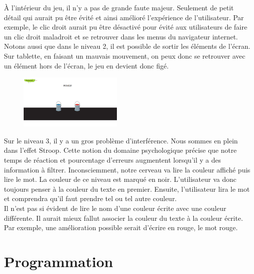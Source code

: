 \documentclass{article}
\begin{document}
\`A l'int\'erieur du jeu, il n'y a pas de grande faute majeur. Seulement de petit d\'etail qui aurait pu \^etre \'evit\'e et ainsi am\'elior\'e l'exp\'erience de l'utilisateur. Par exemple, le clic droit aurait pu \^etre d\'esactiv\'e pour \'evit\'e aux utilisateurs de faire un clic droit maladroit et se retrouver dans les menus du navigateur internet. Notons aussi que dans le niveau 2, il est possible de sortir les \'el\'ements de l'\'ecran. Sur tablette, en faisant un mauvais mouvement, on peux donc se retrouver avec un \'el\'ement hors de l'\'ecran, le jeu en devient donc fig\'e.\\
\begin{figure}
\vspace{6pt}
\centering
\includegraphics[width=5cm]{6}
\end{figure}
{\hspace*{0.6cm}Sur le niveau 3, il y a un gros probl\`eme d'interf\'erence. Nous sommes en plein dans l'effet Stroop. Cette notion du domaine psychologique pr\'ecise que notre temps de r\'eaction et pourcentage d'erreurs augmentent lorsqu'il y a des information \`a filtrer. Inconsciemment, notre cerveau va lire la couleur affich\'e puis lire le mot. La couleur de ce niveau est marqu\'e en noir. L'utilisateur va donc toujours penser \`a la couleur du texte en premier. Ensuite, l'utilisateur lira le mot et comprendra qu'il faut prendre tel ou tel autre couleur.}
\vspace{0.5cm}\\
Il n'est pas si \'evident de lire le nom d'une couleur \'ecrite avec une couleur diff\'erente. Il aurait mieux fallut associer la couleur du texte \`a la couleur \'ecrite. Par exemple, une am\'elioration possible serait d'\'ecrire en rouge, le mot rouge.


\newpage

\section{Programmation}
\end{document}
